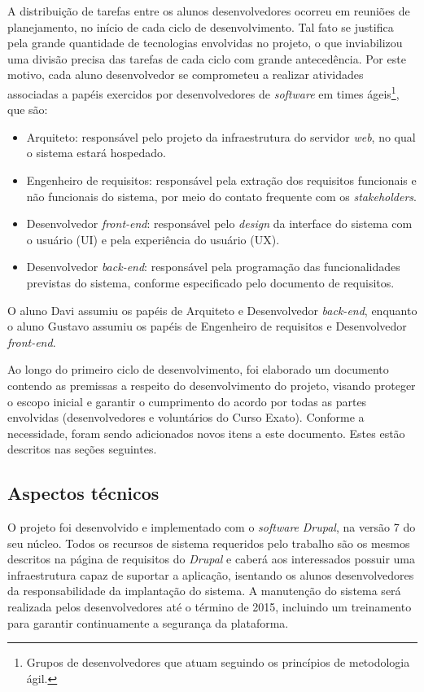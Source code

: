 \documentclass[a4paper]{article}
\begin{document}
A distribuição de tarefas entre os alunos desenvolvedores ocorreu em reuniões de planejamento, no início de cada ciclo de desenvolvimento. Tal fato se justifica pela grande quantidade de tecnologias envolvidas no projeto, o que inviabilizou uma divisão precisa das tarefas de cada ciclo com grande antecedência. Por este motivo, cada aluno desenvolvedor se comprometeu a realizar atividades associadas a papéis exercidos por desenvolvedores de \textit{software} em times ágeis\footnote{Grupos de desenvolvedores que atuam seguindo os princípios de metodologia ágil.}, que são:
\begin{itemize}
\item Arquiteto: responsável pelo projeto da infraestrutura do servidor \textit{web}, no qual o sistema estará hospedado.
\item Engenheiro de requisitos: responsável pela extração dos requisitos funcionais e não funcionais do sistema, por meio do contato frequente com os \textit{stakeholders}.
\item Desenvolvedor \textit{front-end}: responsável pelo \textit{design} da interface do sistema com o usuário (UI) e pela experiência do usuário (UX).
\item Desenvolvedor \textit{back-end}: responsável pela programação das funcionalidades previstas do sistema, conforme especificado pelo documento de requisitos.
\end{itemize}

O aluno Davi assumiu os papéis de Arquiteto e Desenvolvedor \textit{back-end}, enquanto o aluno Gustavo assumiu os papéis de Engenheiro de requisitos e Desenvolvedor \textit{front-end}.

Ao longo do primeiro ciclo de desenvolvimento, foi elaborado um documento contendo as premissas a respeito do desenvolvimento do projeto, visando proteger o escopo inicial e garantir o cumprimento do acordo por todas as partes envolvidas (desenvolvedores e voluntários do Curso Exato). Conforme a necessidade, foram sendo adicionados novos itens a este documento. Estes estão descritos nas seções seguintes.

\subsection{Aspectos técnicos}\label{ssec:tech}

O projeto foi desenvolvido e implementado com o \textit{software} \textit{Drupal}, na versão 7 do seu núcleo. Todos os recursos de sistema requeridos pelo trabalho são os mesmos descritos na página de requisitos do \textit{Drupal} \cite{requirements} e caberá aos interessados possuir uma infraestrutura capaz de suportar a aplicação, isentando os alunos desenvolvedores da responsabilidade da implantação do sistema. A manutenção do sistema será realizada pelos desenvolvedores até o término de 2015, incluindo um treinamento para garantir continuamente a segurança da plataforma.
\end{document}
